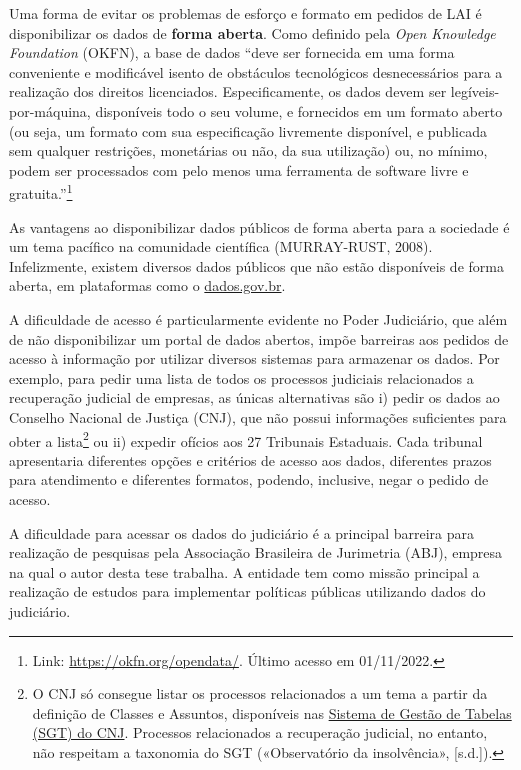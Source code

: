 \documentclass[12pt,twoside,brazilian]{book}
\begin{document}
Uma forma de evitar os problemas de esforço e formato em pedidos de LAI
é disponibilizar os dados de \textbf{forma aberta}. Como definido pela
\emph{Open Knowledge Foundation} (OKFN), a base de dados ``deve ser
fornecida em uma forma conveniente e modificável isento de obstáculos
tecnológicos desnecessários para a realização dos direitos licenciados.
Especificamente, os dados devem ser legíveis-por-máquina, disponíveis
todo o seu volume, e fornecidos em um formato aberto (ou seja, um
formato com sua especificação livremente disponível, e publicada sem
qualquer restrições, monetárias ou não, da sua utilização) ou, no
mínimo, podem ser processados com pelo menos uma ferramenta de software
livre e gratuita.''\footnote{Link: \url{https://okfn.org/opendata/}.
  Último acesso em 01/11/2022.}

As vantagens ao disponibilizar dados públicos de forma aberta para a
sociedade é um tema pacífico na comunidade científica (MURRAY-RUST,
2008). Infelizmente, existem diversos dados públicos que não estão
disponíveis de forma aberta, em plataformas como o
\href{https://dados.gov.br}{dados.gov.br}.

A dificuldade de acesso é particularmente evidente no Poder Judiciário,
que além de não disponibilizar um portal de dados abertos, impõe
barreiras aos pedidos de acesso à informação por utilizar diversos
sistemas para armazenar os dados. Por exemplo, para pedir uma lista de
todos os processos judiciais relacionados a recuperação judicial de
empresas, as únicas alternativas são i) pedir os dados ao Conselho
Nacional de Justiça (CNJ), que não possui informações suficientes para
obter a lista\footnote{O CNJ só consegue listar os processos
  relacionados a um tema a partir da definição de Classes e Assuntos,
  disponíveis nas
  \href{https://www.cnj.jus.br/sgt/consulta_publica_classes.php}{Sistema
  de Gestão de Tabelas (SGT) do CNJ}. Processos relacionados a
  recuperação judicial, no entanto, não respeitam a taxonomia do SGT
  ({«Observatório da insolvência»}, {[}s.d.{]}).} ou ii) expedir ofícios
aos 27 Tribunais Estaduais. Cada tribunal apresentaria diferentes opções
e critérios de acesso aos dados, diferentes prazos para atendimento e
diferentes formatos, podendo, inclusive, negar o pedido de acesso.

A dificuldade para acessar os dados do judiciário é a principal barreira
para realização de pesquisas pela Associação Brasileira de Jurimetria
(ABJ), empresa na qual o autor desta tese trabalha. A entidade tem como
missão principal a realização de estudos para implementar políticas
públicas utilizando dados do judiciário.
\end{document}
